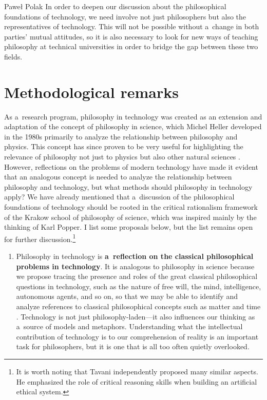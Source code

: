 \begin{artengenv}{Paweł Polak}
In order to deepen our discussion about the philosophical foundations of technology, we need involve not just philosophers but also the representatives of technology. This will not be possible without a~change in both parties' mutual attitudes, so it is also necessary to look for new ways of teaching philosophy at technical universities in order to bridge the gap between these two fields.



\section{Methodological remarks}

As a~research program, philosophy in technology was created as an extension and adaptation of the concept of philosophy in science, which Michel Heller developed in the 1980s primarily to analyze the relationship between philosophy and physics. This concept has since proven to be very useful for highlighting the relevance of philosophy not just to physics but also other natural sciences 
\parencites[e.g.,][]{brozek_philosophy_2011}[][]{polak_oblicza_2017}. %
 However, reflections on the problems of modern technology have made it evident that an analogous concept is needed to analyze the relationship between philosophy and technology, but what methods should philosophy in technology apply? We have already mentioned that a~discussion of the philosophical foundations of technology should be rooted in the critical rationalism framework of the Krakow school of philosophy of science, which was inspired mainly by the thinking of Karl Popper. I list some proposals below, but the list remains open for further discussion.\footnote{It is worth noting that Tavani 
\parencite*[][]{tavani_ethics_2013} %
 independently proposed many similar aspects. He emphasized the role of critical reasoning skills when building an artificial ethical system.}


\begin{enumerate}[label=(\Roman*)]
\item Philosophy in technology is \textbf{a~reflection on the classical philosophical problems in technology}. It is analogous to philosophy in science because we propose tracing the presence and roles of the great classical philosophical questions in technology, such as the nature of free will, the mind, intelligence, autonomous agents, and so on, so that we may be able to identify and analyze references to classical philosophical concepts such as matter and time 
\parencite[e.g.,][]{Bolter1984TuringsMan}. %
 Technology is not just philosophy-laden---it also influences our thinking as a~source of models and metaphors. Understanding what the intellectual contribution of technology is to our comprehension of reality is an important task for philosophers, but it is one that is all too often quietly overlooked.




\end{enumerate}
\end{artengenv}
